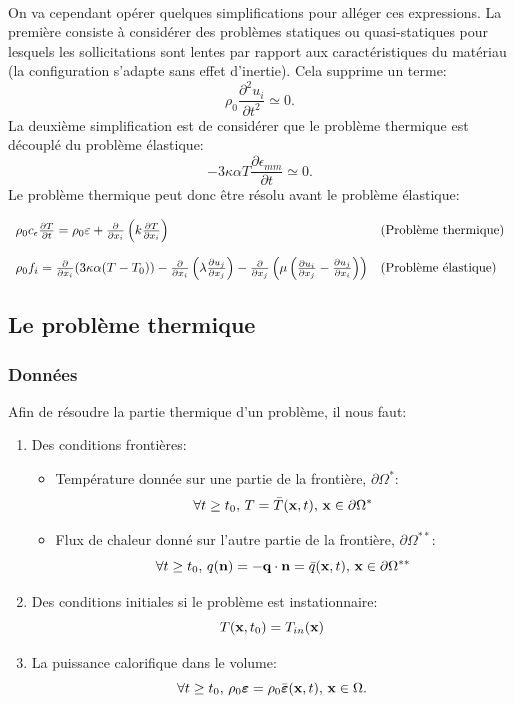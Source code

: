\paragraph{}
On va cependant opérer quelques simplifications pour alléger ces expressions. La première consiste à considérer des problèmes statiques ou quasi-statiques pour lesquels les sollicitations sont lentes par rapport aux caractéristiques du matériau (la configuration s'adapte sans effet d'inertie). Cela supprime un terme:
$$\rho_0\frac{\partial^2u_i}{\partial t^2}\simeq 0.$$
La deuxième simplification est de considérer que le problème thermique est découplé du problème élastique:
$$-3\kappa\alpha T\frac{\partial \epsilon_{mm}}{\partial t}\simeq 0.$$ Le problème thermique peut donc être résolu avant le problème élastique:

$$\begin{array}{ll}
\rho_0c_\epsilon\frac{\partial T}{\partial t}=\rho_0\varepsilon+\frac{\partial}{\partial x_i}\left(k\frac{\partial T}{\partial x_i}\right)&\text{(Problème thermique)}\vspace{0.4cm}\\
\rho_0f_i=\frac{\partial}{\partial x_i}(3\kappa\alpha(T-T_0))-\frac{\partial}{\partial x_i}\left(\lambda\frac{\partial u_j}{\partial x_j}\right)-\frac{\partial}{\partial x_j}\left(\mu\left(\frac{\partial u_i}{\partial x_j}-\frac{\partial u_j}{\partial x_i}\right)\right) &\text{(Problème élastique)}
\end{array}$$

\subsection{Le problème thermique}
\subsubsection*{Données}
Afin de résoudre la partie thermique d'un problème, il nous faut:
\begin{enumerate}
\item Des conditions frontières:
	\begin{itemize}
	\item Température donnée sur une partie de la frontière, $\partial\Omega^*$:
	  $$\forall t\geq t_0,\, T=\bar{T}(\textbf{x},t),\, \textbf{x}\in\partial\Omega^*$$
	\item Flux de chaleur donné sur l'autre partie de la frontière, $\partial\Omega^{**}$:
	 $$\forall t\geq t_0,\, q(\textbf{n})=-\textbf{q}\cdot\textbf{n}=\bar{q}(\textbf{x},t),\, \textbf{x}\in\partial\Omega^{**}$$
	\end{itemize}
\item Des conditions initiales si le problème est instationnaire: $$T(\textbf{x},t_0)=T_{in}(\textbf{x})$$
\item La puissance calorifique dans le volume:
$$\forall t\geq t_0,\,\rho_0\boldsymbol{\varepsilon}=\rho_0\bar{\boldsymbol{\varepsilon}}(\textbf{x},t),\, \textbf{x}\in \Omega.$$
\end{enumerate}
